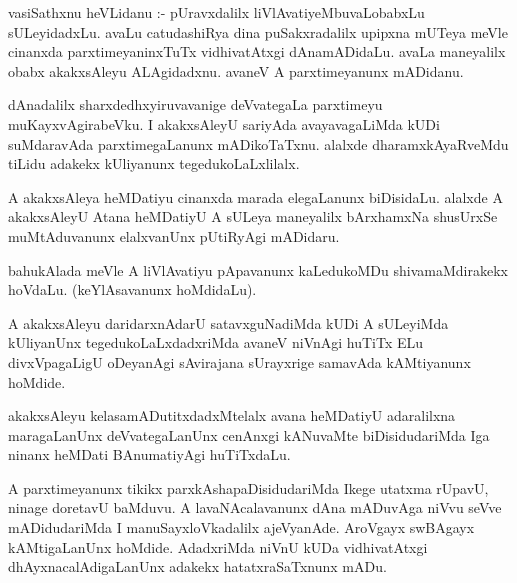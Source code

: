 \documentclass{article}
\begin{document}
\begin{mn}
vasiSathxnu  heVLidanu :- pUravxdalilx  liVlAvatiyeMbuvaLobabxLu  sULeyidadxLu.  
avaLu  catudashiRya  dina  puSakxradalilx  upipxna  mUTeya  meVle  
cinanxda parxtimeyaninxTuTx  vidhivatAtxgi  dAnamADidaLu.  avaLa  maneyalilx  
obabx  akakxsAleyu  ALAgidadxnu.  avaneV  A  parxtimeyanunx  mADidanu.
\end{mn}

\begin{mn}
dAnadalilx  sharxdedhxyiruvavanige  deVvategaLa  parxtimeyu  muKayxvAgirabeVku.  
I  akakxsAleyU  sariyAda  avayavagaLiMda  kUDi  suMdaravAda  parxtimegaLanunx  
mADikoTaTxnu.  alalxde  dharamxkAyaRveMdu  tiLidu  adakekx  kUliyanunx  tegedukoLaLxlilalx.
\end{mn}

\begin{mn}
A akakxsAleya  heMDatiyu  cinanxda  marada  elegaLanunx  biDisidaLu.  alalxde  A  
akakxsAleyU  Atana  heMDatiyU  A  sULeya  maneyalilx  bArxhamxNa  shusUrxSe  
muMtAduvanunx  elalxvanUnx  pUtiRyAgi  mADidaru.
\end{mn}

\begin{mn}
bahukAlada  meVle  A  liVlAvatiyu  pApavanunx  kaLedukoMDu  shivamaMdirakekx  
hoVdaLu.  (keYlAsavanunx  hoMdidaLu).
\end{mn}

\begin{mn}
A akakxsAleyu  daridarxnAdarU  satavxguNadiMda  kUDi  A  sULeyiMda  kUliyanUnx  
tegedukoLaLxdadxriMda  avaneV  niVnAgi  huTiTx  ELu divxVpagaLigU  oDeyanAgi  
sAvirajana  sUrayxrige  samavAda  kAMtiyanunx  hoMdide.
\end{mn}

\begin{mn}
akakxsAleyu  kelasamADutitxdadxMtelalx  avana  heMDatiyU  adaralilxna  maragaLanUnx  deVvategaLanUnx  
cenAnxgi  kANuvaMte  biDisidudariMda  Iga  ninanx  heMDati  BAnumatiyAgi  huTiTxdaLu.
\end{mn}

\begin{mn}
A  parxtimeyanunx  tikikx  parxkAshapaDisidudariMda  Ikege  utatxma rUpavU,  ninage  
doretavU  baMduvu.  A  lavaNAcalavanunx  dAna  mADuvAga  niVvu  seVve  mADidudariMda  
I  manuSayxloVkadalilx  ajeVyanAde.  AroVgayx  swBAgayx  kAMtigaLanUnx  hoMdide.  
AdadxriMda  niVnU  kUDa  vidhivatAtxgi  dhAyxnacalAdigaLanUnx  adakekx  hatatxraSaTxnunx  mADu.
\end{mn}
\end{document}
